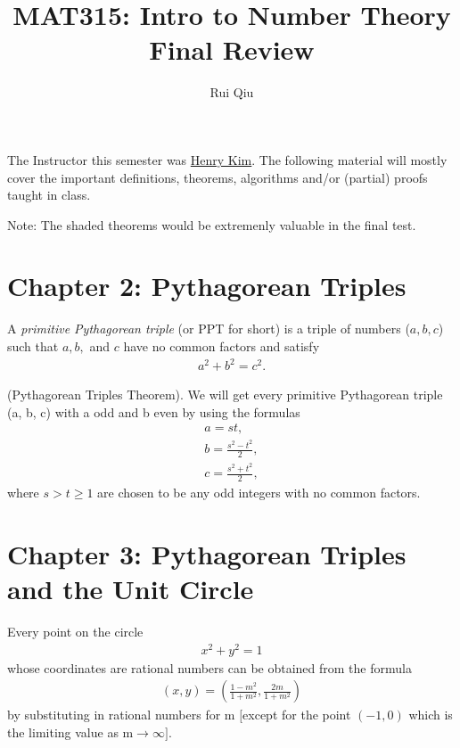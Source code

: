 \documentclass[graybox]{svmult}
\begin{document}
\title*{MAT315: Intro to Number Theory Final Review}
\author{Rui Qiu}

\maketitle

The Instructor this semester was \href{http://www.math.toronto.edu/henrykim/henrykim.html}{Henry Kim}.
The following material will mostly cover the important definitions, theorems, algorithms and/or (partial) proofs taught in class.

Note: The shaded theorems would be extremenly valuable in the final test.

\section*{Chapter 2: Pythagorean Triples}

\begin{definition}
A \textit{primitive Pythagorean triple} (or PPT for short) is a triple of numbers ($a, b, c$) such that $a, b,$ and $c$ have no common factors and satisfy
\begin{align*} 
a^2 + b^2 = c^2.
\end{align*}
\end{definition}

\begin{svgraybox}
\begin{theorem}
(Pythagorean Triples Theorem). We will get every primitive Pythagorean triple (a, b, c) 
with a odd and b even by using the formulas
\begin{align*}
a = st, \\
b = \frac{s^2-t^2}{2}, \\
c = \frac{s^2+t^2}{2},
\end{align*}
where $s > t \geqslant 1$ are chosen to be any odd integers with no common factors.
\end{theorem}
\end{svgraybox}

\section*{Chapter 3: Pythagorean Triples and the Unit Circle}

\begin{theorem}
Every point on the circle
\begin{align*}
x^2 + y^2 = 1
\end{align*}
whose coordinates are rational numbers can be obtained from the formula
\begin{align*}
(x, y) = \left(\frac{1-m^2}{1+m^2}, \frac{2m}{1+m^2}\right)
\end{align*}
by substituting in rational numbers for m $\lbrack$except for the point $(-1, 0)$ which is the limiting value as m$\rightarrow\infty \rbrack$.
\end{theorem}
\end{document}
